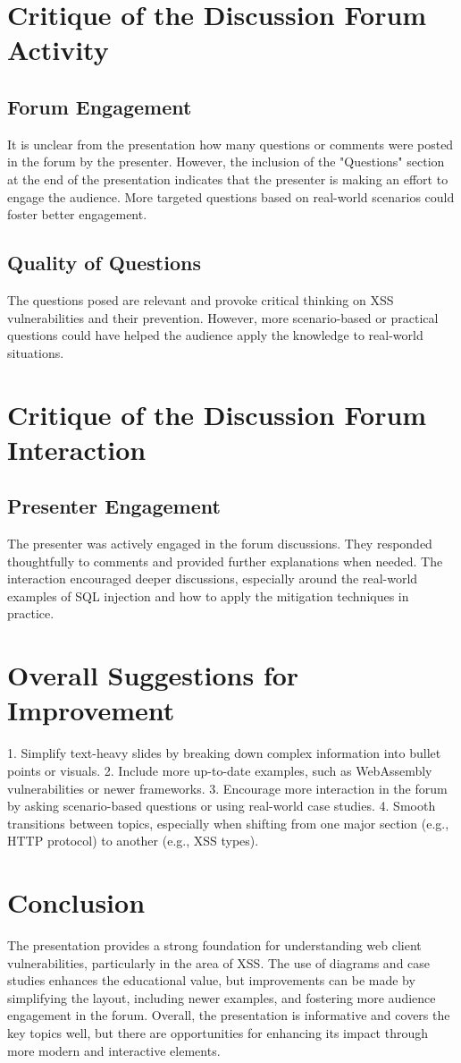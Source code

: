\documentclass{article}
\begin{document}
\section{Critique of the Discussion Forum Activity }
\subsection{Forum Engagement}
It is unclear from the presentation how many questions or comments were posted in the forum by the presenter. However, the inclusion of the "Questions" section at the end of the presentation indicates that the presenter is making an effort to engage the audience. More targeted questions based on real-world scenarios could foster better engagement.

\subsection{Quality of Questions}
The questions posed are relevant and provoke critical thinking on XSS vulnerabilities and their prevention. However, more scenario-based or practical questions could have helped the audience apply the knowledge to real-world situations.

\section{Critique of the Discussion Forum Interaction }
\subsection{Presenter Engagement}
The presenter was actively engaged in the forum discussions. They responded thoughtfully to comments and provided further explanations when needed. The interaction encouraged deeper discussions, especially around the real-world examples of SQL injection and how to apply the mitigation techniques in practice.

\section{Overall Suggestions for Improvement}
1. Simplify text-heavy slides by breaking down complex information into bullet points or visuals.
2. Include more up-to-date examples, such as WebAssembly vulnerabilities or newer frameworks.
3. Encourage more interaction in the forum by asking scenario-based questions or using real-world case studies.
4. Smooth transitions between topics, especially when shifting from one major section (e.g., HTTP protocol) to another (e.g., XSS types).

\section{Conclusion}
The presentation provides a strong foundation for understanding web client vulnerabilities, particularly in the area of XSS. The use of diagrams and case studies enhances the educational value, but improvements can be made by simplifying the layout, including newer examples, and fostering more audience engagement in the forum. Overall, the presentation is informative and covers the key topics well, but there are opportunities for enhancing its impact through more modern and interactive elements.
\end{document}
